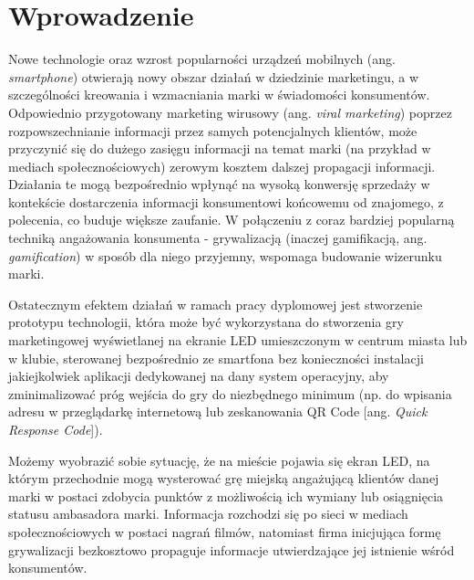 \newpage
\section{Wprowadzenie}

Nowe technologie oraz wzrost popularności urządzeń mobilnych (ang. \emph{smartphone}) otwierają nowy obszar działań w dziedzinie marketingu, a w szczególności kreowania i wzmacniania marki w świadomości konsumentów. Odpowiednio przygotowany marketing wirusowy (ang. 
\emph{viral marketing}) poprzez rozpowszechnianie informacji przez samych potencjalnych klientów, może przyczynić się do dużego zasięgu informacji na temat marki (na przykład w mediach społecznościowych) zerowym kosztem dalszej propagacji informacji. Działania te mogą bezpośrednio wpłynąć na wysoką konwersję sprzedaży w kontekście dostarczenia informacji konsumentowi końcowemu od znajomego, z polecenia, co buduje większe zaufanie. W połączeniu z coraz bardziej popularną techniką angażowania konsumenta - grywalizacją (inaczej gamifikacją, ang. \emph{gamification}) w sposób dla niego przyjemny, wspomaga budowanie wizerunku marki.

Ostatecznym efektem działań w ramach pracy dyplomowej jest stworzenie prototypu technologii, która może być wykorzystana do stworzenia gry marketingowej wyświetlanej na ekranie LED umieszczonym w centrum miasta lub w klubie, sterowanej bezpośrednio ze smartfona bez konieczności instalacji jakiejkolwiek aplikacji dedykowanej na dany system operacyjny, aby zminimalizować próg wejścia do gry do niezbędnego minimum (np. do wpisania adresu w przeglądarkę internetową lub zeskanowania QR Code [ang. \emph{Quick Response Code}]).

Możemy wyobrazić sobie sytuację, że na mieście pojawia się ekran LED, na którym przechodnie mogą wysterować grę miejską angażującą klientów danej marki w postaci zdobycia punktów z możliwością ich wymiany lub osiągnięcia statusu ambasadora marki. Informacja rozchodzi się po sieci w mediach społecznościowych w postaci nagrań filmów, natomiast firma inicjująca formę grywalizacji bezkosztowo propaguje informacje utwierdzające jej istnienie wśród konsumentów.

